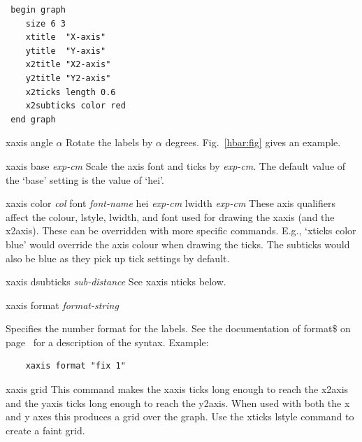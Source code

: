 \begin{commanddescription}
\begin{minipage}[c]{8cm}
\begin{Verbatim}
 begin graph
    size 6 3
    xtitle  "X-axis"
    ytitle  "Y-axis"
    x2title "X2-axis"
    y2title "Y2-axis"
    x2ticks length 0.6
    x2subticks color red
 end graph
\end{Verbatim}
\end{minipage}
\hfill
\begin{minipage}[c]{7cm}
\mbox{}
\end{minipage}

\item[{\sf xaxis angle $\alpha$}]
Rotate the labels by $\alpha$ degrees. Fig.~\ref{hbar:fig} gives an example.

\item[{\sf xaxis base {\it exp-cm}} ]
Scale the axis font and ticks by {\it exp-cm}. The default value of the `{\sf base}' setting is the value of `{\sf hei}'.

\item[{\sf xaxis color {\it col} font {\it font-name}  hei {\it exp-cm} lwidth {\it exp-cm}} ]
These axis qualifiers affect the colour, lstyle, lwidth, and font used for drawing the xaxis (and the x2axis).  These can be overridden with more specific commands. E.g., `{\sf xticks color blue}' would override the axis colour when drawing the ticks. The subticks would also be blue as they pick up tick settings by default.

\item[{\sf xaxis dsubticks {\it sub-distance} }  ]
See {\sf xaxis nticks} below.

\item[{\sf xaxis format {\it format-string}} ]

Specifies the number format for the labels. See the documentation of {\sf format\$} on page~\pageref{formatnum:pg} for a description of the syntax. Example:

\preglecode{}
\begin{Verbatim}
	xaxis format "fix 1"
\end{Verbatim}
\postglecode{}

\item[{\sf xaxis grid }  ]
This command makes the xaxis ticks long enough to reach the x2axis and the yaxis ticks long enough to reach the y2axis. When used with both the x and y axes this produces a grid over the graph. Use the {\sf xticks lstyle} command to create a faint grid.


\end{commanddescription}
